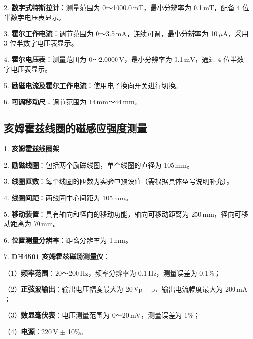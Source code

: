 \documentclass[UTF-8,twoside,cs4size]{ctexart}
\begin{document}
2. \textbf{数字式特斯拉计}：测量范围为 0～1000.0\,$\mathrm{mT}$，最小分辨率为 0.1\,$\mathrm{mT}$，配备 4 位半数字电压表显示。 \par

3. \textbf{霍尔工作电流}：调节范围为 0～3.5\,$\mathrm{mA}$，连续可调，最小分辨率为 10\,$\mu\mathrm{A}$，采用 3 位半数字电压表显示。 \par

4. \textbf{霍尔电压表}：测量范围为 0～2.0000\,$\mathrm{V}$，最小分辨率为 0.1\,$\mathrm{mV}$，通过 4 位半数字电压表显示。 \par

5. \textbf{励磁电流及霍尔工作电流}：使用电子换向开关进行切换。 \par

6. \textbf{可调移动尺}：调节范围为 14\,$\mathrm{mm}$～44\,$\mathrm{mm}$。 \par
\subsection{亥姆霍兹线圈的磁感应强度测量}
1. \textbf{亥姆霍兹线圈架} \par

2. \textbf{励磁线圈}：包括两个励磁线圈，单个线圈的直径为 105\,$\mathrm{mm}$。 \par

3. \textbf{线圈匝数}：每个线圈的匝数为实验中预设值（需根据具体型号说明补充）。 \par

4. \textbf{线圈间距}：两线圈中心间距为 105\,$\mathrm{mm}$。 \par

5. \textbf{移动装置}：具有轴向和径向的移动功能，轴向可移动距离为 250\,$\mathrm{mm}$，径向可移动距离为 70\,$\mathrm{mm}$。 \par

6. \textbf{位置测量分辨率}：距离分辨率为 1\,$\mathrm{mm}$。 \par

7. \textbf{DH4501 亥姆霍兹磁场测量仪}： \par
   （1）\textbf{频率范围}：20～200\,$\mathrm{Hz}$，频率分辨率为 0.1\,$\mathrm{Hz}$，测量误差为 0.1\%； \par
   （2）\textbf{正弦波输出}：输出电压幅度最大为 20\,$\mathrm{Vp-p}$，输出电流幅度最大为 200\,$\mathrm{mA}$； \par
   （3）\textbf{数显毫伏表}：电压测量范围为 0～20\,$\mathrm{mV}$，测量误差为 1\%； \par
   （4）\textbf{电源}：220\,$\mathrm{V}$ $\pm$ 10\%。 \par
\end{document}
